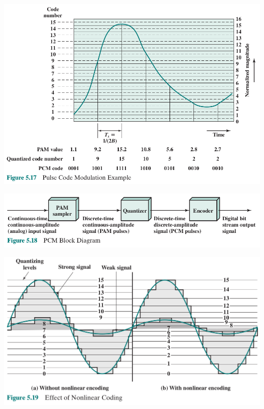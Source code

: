 \documentclass[pdflatex,compress]{beamer}
\begin{document}
\begin{frame}
	\begin{center}
		\includegraphics[width=0.9\linewidth]{img/img24}
	\end{center}
\end{frame}

\begin{frame}
	\begin{center}
		\includegraphics[width=\linewidth]{img/img25}
	\end{center}
\end{frame}

\begin{frame}
	\begin{center}
		\includegraphics[width=\linewidth]{img/img26}
	\end{center}
\end{frame}
\end{document}
